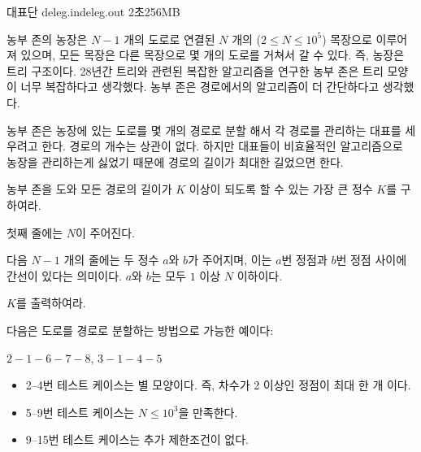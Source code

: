 \begin{problem}{대표단}
	{deleg.in}{deleg.out}
	{2초}{256MB}{}
	
	농부 존의 농장은 $N-1$ 개의 도로로 연결된 $N$ 개의 ($2 \le N \le 10^5$) 목장으로 이루어져 있으며, 모든 목장은 다른 목장으로 몇 개의 도로를 거쳐서 갈 수 있다. 즉, 농장은 트리 구조이다. 28년간 트리와 관련된 복잡한 알고리즘을 연구한 농부 존은 트리 모양이 너무 복잡하다고 생각했다. 농부 존은 경로에서의 알고리즘이 더 간단하다고 생각했다.
	
	농부 존은 농장에 있는 도로를 몇 개의 경로로 분할 해서 각 경로를 관리하는 대표를 세우려고 한다. 경로의 개수는 상관이 없다. 하지만 대표들이 비효율적인 알고리즘으로 농장을 관리하는게 싫었기 때문에 경로의 길이가 최대한 길었으면 한다.
	
	농부 존을 도와 모든 경로의 길이가 $K$ 이상이 되도록 할 수 있는 가장 큰 정수 $K$를 구하여라.
	
	\InputFile
	
	첫째 줄에는 $N$이 주어진다.
	
	다음 $N-1$ 개의 줄에는 두 정수 $a$와 $b$가 주어지며, 이는 $a$번 정점과 $b$번 정점 사이에 간선이 있다는 의미이다. $a$와 $b$는 모두 $1$ 이상 $N$ 이하이다.
	
	
	\OutputFile
	
	$K$를 출력하여라.
	
	\Example
		
	\begin{example}
	\end{example}
	
	다음은 도로를 경로로 분할하는 방법으로 가능한 예이다:
	
	\begin{center}
		$2 - 1 - 6 - 7 - 8$, $3 - 1 - 4 - 5$
	\end{center}
	
	\Scoring
	
	\begin{itemize}
		\item 2--4번 테스트 케이스는 별 모양이다. 즉, 차수가 2 이상인 정점이 최대 한 개 이다.
		\item 5--9번 테스트 케이스는 $N \le 10^3$을 만족한다.
		\item 9--15번 테스트 케이스는 추가 제한조건이 없다.
	\end{itemize}
	
	
	
	
\end{problem}

